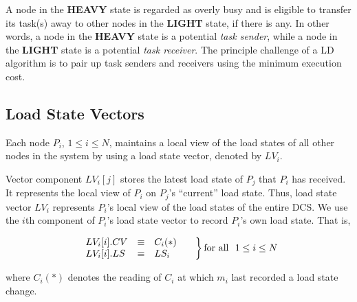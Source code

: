 A node in the {\bf HEAVY} state is regarded as overly busy and
is eligible to transfer its task(s) away
to other nodes in the {\bf LIGHT} state, if there is any.
In other words, a node in the {\bf HEAVY} state is a potential
{\it task sender\/},
while a node in the {\bf LIGHT} state is a potential {\it task receiver\/}.
The principle challenge of a LD algorithm is
to pair up task senders and receivers using the minimum execution cost.



\subsection {Load State Vectors}

Each node $P_i$, $1 \leq i \leq N$, maintains a local view
of the load states of all other nodes in the system
by using a load state vector, denoted by $LV_i$.


Vector component $LV_i[j]$ stores the latest load state
of $P_j$ that $P_i$ has received.
It represents the local view of $P_i$ on $P_j$'s ``current'' load state.
Thus, load state vector $LV_i$ represents $P_i$'s
local view of the load states of the entire DCS.
We use the $i$th component of $P_i$'s load state vector to
record $P_i$'s own load state.  That is,

\begin{equation}
        \left.
        \begin{array}{lll}
        LV_i[i].CV & \equiv & C_i(*)        \\
        LV_i[i].LS & \equiv & LS_i
        \end{array}
        \hspace*{5mm}
        \right\}
        \mbox{for all \ } 1 \leq i \leq N
\end{equation}

\noindent
where $C_i(*)$ denotes the reading of $C_i$
at which $m_i$ last recorded a load state change.





